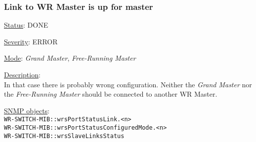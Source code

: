 \subsubsection{\bf Link to WR Master is up for master}
		\label{fail:timing:master_up}
		\begin{packed_enum}
			\item [] \underline{Status}: DONE
			\item [] \underline{Severity}: ERROR
			\item [] \underline{Mode}: \emph{Grand Master}, \emph{Free-Running Master}
			\item [] \underline{Description}:\\
				In that case there is probably wrong configuration. Neither the
				\emph{Grand Master} nor the \emph{Free-Running Master} should be
				connected to another WR Master.
			\item [] \underline{SNMP objects}:\\
				\texttt{WR-SWITCH-MIB::wrsPortStatusLink.<n>}\\
				\texttt{WR-SWITCH-MIB::wrsPortStatusConfiguredMode.<n>}\\
				\texttt{WR-SWITCH-MIB::wrsSlaveLinksStatus}
		\end{packed_enum}

